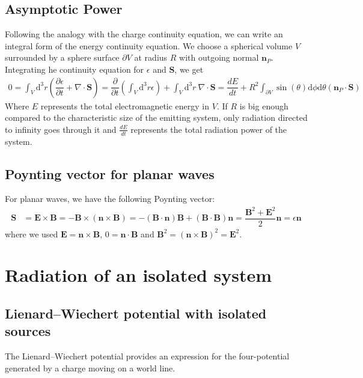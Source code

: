 \documentclass[10pt, a4paper]{article}
\begin{document}
{\subsection{Asymptotic Power}
Following the analogy with the charge continuity equation, we can write an integral form of the energy continuity equation. We choose a spherical volume $V$ surrounded by a sphere surface $\partial V$ at radius $R$ with outgoing normal $\mathbf{n}_P$. Integrating he continuity equation for $\epsilon$ and $\mathbf{S}$, we get 
\begin{align*}
   0 = \int_V \text{d}^3 r \left(\dfrac{\partial \epsilon}{\partial t} + \nabla  \cdot \mathbf{S}\right) = \dfrac{\partial }{\partial t} \left(\int_V \text{d}^3 r \epsilon\right) + \int_V \text{d}^3 r \ \nabla  \cdot \mathbf{S} = \dfrac{d E}{d t}  + R^2\int_{\partial V} \sin(\theta) \text{d}\phi \text{d}\theta (\mathbf{n}_P \cdot \mathbf{S})
\end{align*}
Where $E$ represents the total electromagnetic energy in $V$. If $R$ is big enough compared to the characteristic size of the emitting system, only radiation directed to infinity goes through it and $\frac{dE}{dt}$ represents the total radiation power of the system. 

\subsection{Poynting vector for planar waves}
For planar waves, we have the following Poynting vector:
\begin{align*}
    \mathbf{S} &= \mathbf{E}\times\mathbf{B} = -\mathbf{B} \times (\mathbf{n} \times \mathbf{B}) =- (\mathbf{B} \cdot \mathbf{n}) \mathbf{B} + (\mathbf{B} \cdot \mathbf{B}) \mathbf{n} = \dfrac{\mathbf{B}^2 + \mathbf{E}^2}{2} \mathbf{n} = \epsilon \mathbf{n} 
\end{align*}
where we used $\mathbf{E} = \mathbf{n} \times \mathbf{B}$, $0 = \mathbf{n} \cdot \mathbf{B}$ and $\mathbf{B}^2 = (\mathbf{n} \times \mathbf{B})^2 =  \mathbf{E}^2$. 
\section{Radiation of an isolated system}
\subsection{Lienard–Wiechert potential with isolated sources}
The Lienard–Wiechert potential provides an expression for the four-potential generated by a charge moving on a world line. 

}
\end{document}
